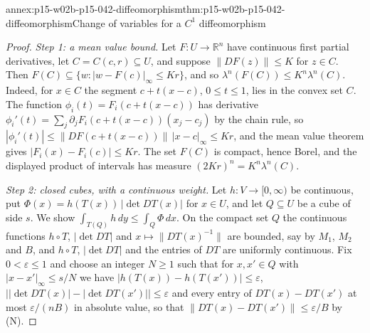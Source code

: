 \begin{annexitem}{annex:p15-w02b-p15-042-diffeomorphism}{thm:p15-w02b-p15-042-diffeomorphism}{Change of variables for a \(C^1\) diffeomorphism}
\begin{proof}
\emph{Step 1: a mean value bound.} Let \(F:U\to\mathbb R^n\) have
continuous first partial derivatives, let \(C=C(c,r)\subseteq U\), and
suppose \(\|DF(z)\|\leq K\) for \(z\in C\). Then
\(F(C)\subseteq\{w:|w-F(c)|_\infty\leq Kr\}\), and so
\(\lambda^n(F(C))\leq K^n\lambda^n(C)\). Indeed, for \(x\in C\) the segment
\(c+t(x-c)\), \(0\leq t\leq1\), lies in the convex set \(C\). The function
\(\phi_i(t)=F_i(c+t(x-c))\) has derivative
\(\phi_i'(t)=\sum_j\partial_jF_i(c+t(x-c))(x_j-c_j)\) by the chain rule, so
\(|\phi_i'(t)|\leq\|DF(c+t(x-c))\|\,|x-c|_\infty\leq Kr\), and the mean
value theorem gives \(|F_i(x)-F_i(c)|\leq Kr\). The set \(F(C)\) is compact,
hence Borel, and the displayed product of intervals has measure
\((2Kr)^n=K^n\lambda^n(C)\).

\emph{Step 2: closed cubes, with a continuous weight.} Let
\(h:V\to[0,\infty)\) be continuous, put
\(\Phi(x)=h(T(x))\,|\det DT(x)|\) for \(x\in U\), and let \(Q\subseteq U\)
be a cube of side \(s\). We show
\(\int_{T(Q)}h\,dy\leq\int_Q\Phi\,dx\). On the compact set \(Q\) the
continuous functions \(h\circ T\), \(|\det DT|\) and
\(x\mapsto\|DT(x)^{-1}\|\) are bounded, say by \(M_1\), \(M_2\) and \(B\),
and \(h\circ T\), \(|\det DT|\) and the entries of \(DT\) are uniformly
continuous. Fix \(0<\varepsilon\leq1\) and choose an integer \(N\geq1\) such
that for \(x,x'\in Q\) with \(|x-x'|_\infty\leq s/N\) we have
\(|h(T(x))-h(T(x'))|\leq\varepsilon\),
\(\bigl||\det DT(x)|-|\det DT(x')|\bigr|\leq\varepsilon\) and every entry of
\(DT(x)-DT(x')\) at most \(\varepsilon/(nB)\) in absolute value, so that
\(\|DT(x)-DT(x')\|\leq\varepsilon/B\) by (N).


\end{proof}
\end{annexitem}
